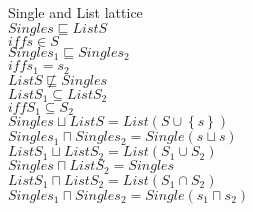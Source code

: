 

\begin{definition}{Single and List lattice}
    \label{def:single-list-lattice}\\
        $Single s \sqsubseteq ListS$\\
        $iff s \in S$\\
        $Single s_1 \sqsubseteq Single s_2$\\
        $iff s_1 = s_2$\\
        $List S \not\sqsubseteq Single s$\\
        $List S_1 \subseteq List S_2$\\
        $iff S_1 \subseteq S_2$\\
        $Single s \sqcup List S = List (S\cup\left\{ s \right\})$\\
        $Single s_1 \sqcap Single s_2 = Single (s \sqcup s )$\\
        $List S_1 \sqcup List S_2 = List (S_1 \cup S_2)$\\
        $Single s \sqcap List S_2 = Single s$\\
        $List S_1 \sqcap List S_2 = List (S_1 \cap S_2)$\\
        $Single s_1 \sqcap Single s_2 = Single (s_1 \sqcap s_2)$
\end{definition}